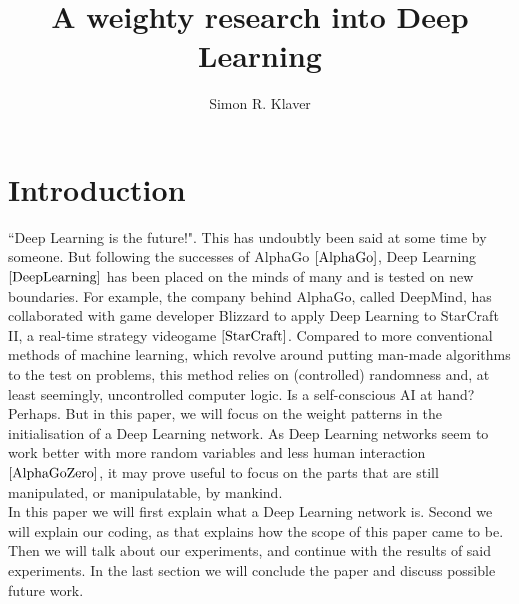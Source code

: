 \documentclass[a4paper, 10pt, notitlepage, twocolumn]{article}
\author{Simon R. Klaver}
\title{A weighty research into Deep Learning}
\begin{document}
\maketitle

\tableofcontents

 \section{Introduction}
 \label{introduction}
  ``Deep Learning is the future!". This has undoubtly been said at some time by someone. But following the successes of AlphaGo $\cite{AlphaGo}$,  Deep Learning $\cite{DeepLearning}$ has been placed on the minds of many and is tested on new boundaries. For example,  the company behind AlphaGo,  called DeepMind,  has collaborated with game developer Blizzard to apply Deep Learning to StarCraft II,  a real-time strategy videogame $\cite{StarCraft}$. Compared to more conventional methods of machine learning,  which revolve around putting man-made algorithms to the test on problems,  this method relies on (controlled) randomness and,  at least seemingly,  uncontrolled computer logic. Is a self-conscious AI at hand? Perhaps. But in this paper,  we will focus on the weight patterns in the initialisation of a Deep Learning network. As Deep Learning networks seem to work better with more random variables and less human interaction $\cite{AlphaGoZero}$,  it may prove useful to focus on the parts that are still manipulated,  or manipulatable,  by mankind.\\
  In this paper we will first explain what a Deep Learning network is. Second we will explain our coding,  as that explains how the scope of this paper came to be. Then we will talk about our experiments,  and continue with the results of said experiments. In the last section we will conclude the paper and discuss possible future work.
  
\end{document}

